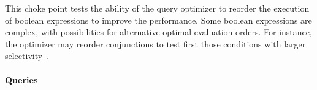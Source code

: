 
This choke point tests the ability of the query optimizer to reorder the execution of boolean expressions to improve the performance. Some boolean expressions are complex, with possibilities for alternative optimal evaluation orders.
For instance, the optimizer may reorder conjunctions to test first those conditions with larger selectivity~\cite{DBLP:conf/vldb/Moerkotte98}.


\paragraph{Queries}
{\raggedright

}